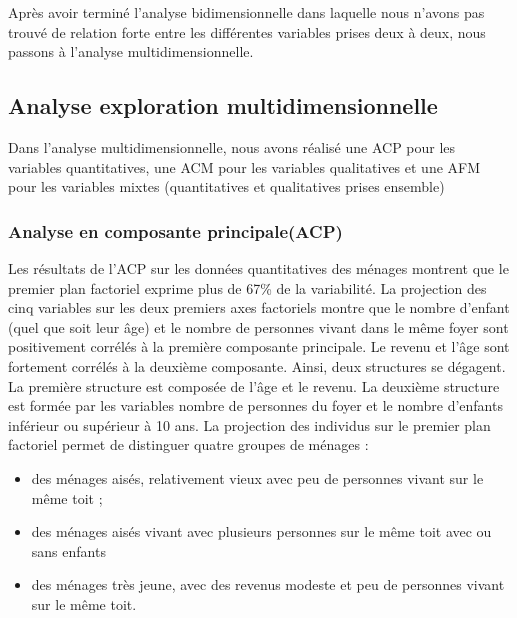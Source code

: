 \documentclass[11pt,a4paper, x11names]{article}\usepackage[]{graphicx}\usepackage[]{color}
\begin{document}
Après avoir terminé l'analyse bidimensionnelle dans laquelle nous n'avons pas trouvé de relation forte entre les différentes variables prises deux à deux, nous passons à l'analyse multidimensionnelle.

\subsection{Analyse exploration multidimensionnelle}
Dans l'analyse multidimensionnelle, nous avons réalisé une ACP pour les variables quantitatives, une ACM pour les variables qualitatives et une AFM pour les variables mixtes (quantitatives et qualitatives prises ensemble)
\subsubsection{Analyse en composante principale(ACP)}
Les résultats de l'ACP sur les données quantitatives des ménages montrent que le premier plan factoriel exprime plus de 67\% de la variabilité. La projection des cinq variables sur les deux premiers axes factoriels montre que le nombre d'enfant (quel que soit leur âge) et le nombre de personnes vivant dans le même foyer sont positivement corrélés à la première composante principale. Le revenu et l'âge sont fortement corrélés à la deuxième composante. Ainsi, deux structures se dégagent. La première structure est composée de l'âge et le revenu. La deuxième structure est formée par les variables nombre de personnes du foyer et le nombre d'enfants inférieur ou supérieur à 10 ans. 
La projection des individus sur le premier plan factoriel permet de distinguer quatre groupes de ménages :
\begin{itemize}
\item des ménages aisés, relativement vieux avec peu de personnes vivant sur le même toit ;
\item des ménages aisés vivant avec plusieurs personnes sur le même toit avec ou sans enfants 
\item des ménages très jeune, avec des revenus modeste et peu de personnes vivant sur le même toit. 
\end{itemize}
\end{document}
